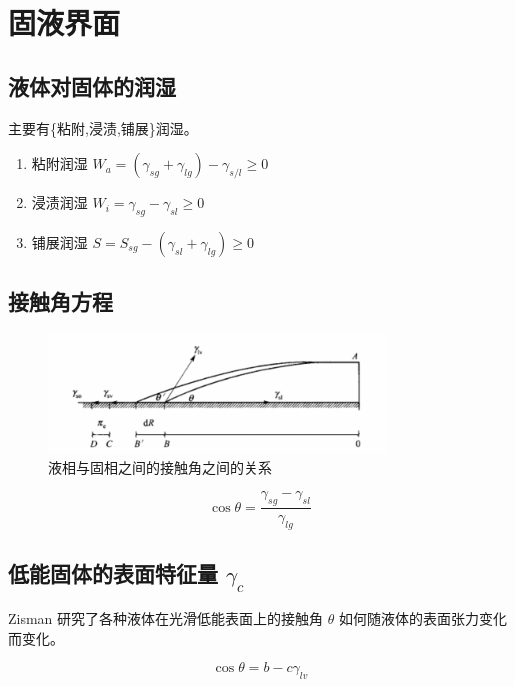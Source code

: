 \chapter{固液界面}

\section{液体对固体的润湿}

主要有\{粘附,浸渍,铺展\}润湿。

\begin{enumerate}
    \item 粘附润湿 $W_a = \left(\gamma_{sg} + \gamma_{lg}\right) - \gamma_{s/l} \geq 0$
    \item 浸渍润湿 $W_i = \gamma_{sg} - \gamma_{sl} \geq 0$
    \item 铺展润湿 $S = S_{sg} - \left(\gamma_{sl} + \gamma_{lg}\right) \geq 0$
\end{enumerate}

\section{接触角方程}

\begin{figure}[h]
    \centering
    \includegraphics[width=0.8\textwidth]{images/sl_surface.png}
    \caption{液相与固相之间的接触角之间的关系}
\end{figure}

\begin{equation}
    \cos \theta = \frac{\gamma_{sg} - \gamma_{sl}}{\gamma_{lg}}
\end{equation}

\section{低能固体的表面特征量 $\gamma_c$}

Zisman 研究了各种液体在光滑低能表面上的接触角 $\theta$ 如何随液体的表面张力变化而变化。

\begin{equation}
    \cos \theta = b - c \gamma_{lv}
\end{equation}
